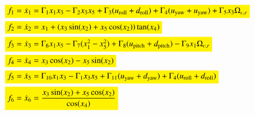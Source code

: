 \documentclass[3p]{elsarticle}
\begin{document}
\begin{align}
    &\colorbox{yellow}{$f_1 = \dot{x}_1 = \Gamma_1 x_1 x_3 - \Gamma_2 x_3 x_5 + \Gamma_3  (u_{\text{roll}} + d_{\text{roll}})
 + \Gamma_4  (u_{\text{yaw}} + u_{\text{yaw}}) 
+ \Gamma_5 x_3\Omega_{c, r}$} \label{eq:eq_of_motion_start1} \\
&\colorbox{yellow}{$f_2 = \dot{x}_2 = x_1 + (x_3\sin(x_2) + x_5\cos(x_2))\tan(x_4)$} \\
&\colorbox{yellow}{$f_3 = \dot{x}_3 = \Gamma_6 x_1 x_5 - \Gamma_7 (x_1^2 - x_5^2) + \Gamma_8  (u_{\text{pitch}} + d_{\text{pitch}})- \Gamma_9 x_1 \Omega_{c, r}$} \\
&\colorbox{yellow}{$f_4 = \dot{x}_4 = x_3\cos(x_2) - x_5\sin(x_2)$} \\
&\colorbox{yellow}{$f_5 = \dot{x}_5 = \Gamma_{10} x_1 x_3 - \Gamma_{1} x_3 x_5 + \Gamma_{11} (u_{\text{yaw}} + d_{\text{yaw}}) + \Gamma_{4}(u_{\text{roll}} + d_{\text{roll}})$} \\
&\colorbox{yellow}{$f_6 = \dot{x}_6 = \dfrac{x_3\sin(x_2) + x_5\cos(x_2)}{\cos(x_4)}$} \label{eq:eq_of_motion_end1}
\end{align}
\end{document}
